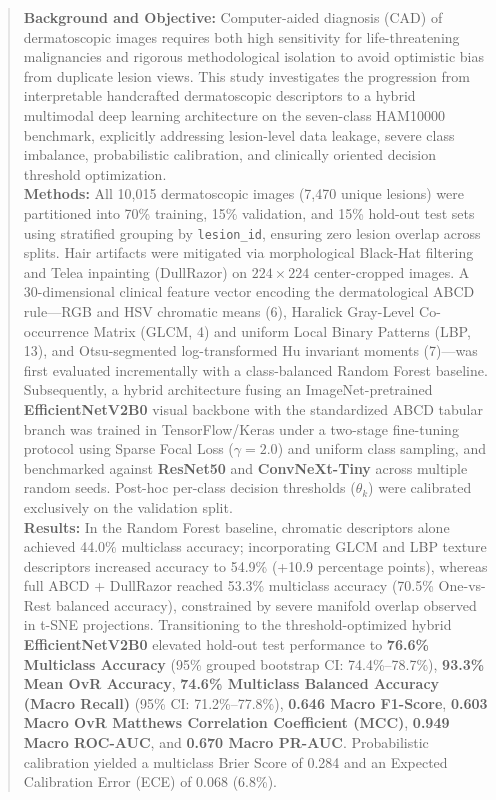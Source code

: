 \documentclass[11pt,a4paper]{article}
\begin{document}
\begin{abstract}
\noindent\textbf{Background and Objective:} Computer-aided diagnosis (CAD) of dermatoscopic images requires both high sensitivity for life-threatening malignancies and rigorous methodological isolation to avoid optimistic bias from duplicate lesion views. This study investigates the progression from interpretable handcrafted dermatoscopic descriptors to a hybrid multimodal deep learning architecture on the seven-class HAM10000 benchmark, explicitly addressing lesion-level data leakage, severe class imbalance, probabilistic calibration, and clinically oriented decision threshold optimization.\\
\noindent\textbf{Methods:} All 10,015 dermatoscopic images (7,470 unique lesions) were partitioned into 70\% training, 15\% validation, and 15\% hold-out test sets using stratified grouping by \texttt{lesion\_id}, ensuring zero lesion overlap across splits. Hair artifacts were mitigated via morphological Black-Hat filtering and Telea inpainting (DullRazor) on $224 \times 224$ center-cropped images. A 30-dimensional clinical feature vector encoding the dermatological ABCD rule---RGB and HSV chromatic means (6), Haralick Gray-Level Co-occurrence Matrix (GLCM, 4) and uniform Local Binary Patterns (LBP, 13), and Otsu-segmented log-transformed Hu invariant moments (7)---was first evaluated incrementally with a class-balanced Random Forest baseline. Subsequently, a hybrid architecture fusing an ImageNet-pretrained \textbf{EfficientNetV2B0} visual backbone with the standardized ABCD tabular branch was trained in TensorFlow/Keras under a two-stage fine-tuning protocol using Sparse Focal Loss ($\gamma=2.0$) and uniform class sampling, and benchmarked against \textbf{ResNet50} and \textbf{ConvNeXt-Tiny} across multiple random seeds. Post-hoc per-class decision thresholds ($\theta_k$) were calibrated exclusively on the validation split.\\
\noindent\textbf{Results:} In the Random Forest baseline, chromatic descriptors alone achieved 44.0\% multiclass accuracy; incorporating GLCM and LBP texture descriptors increased accuracy to 54.9\% (+10.9 percentage points), whereas full ABCD + DullRazor reached 53.3\% multiclass accuracy (70.5\% One-vs-Rest balanced accuracy), constrained by severe manifold overlap observed in t-SNE projections. Transitioning to the threshold-optimized hybrid \textbf{EfficientNetV2B0} elevated hold-out test performance to \textbf{76.6\% Multiclass Accuracy} (95\% grouped bootstrap CI: 74.4\%--78.7\%), \textbf{93.3\% Mean OvR Accuracy}, \textbf{74.6\% Multiclass Balanced Accuracy (Macro Recall)} (95\% CI: 71.2\%--77.8\%), \textbf{0.646 Macro F1-Score}, \textbf{0.603 Macro OvR Matthews Correlation Coefficient (MCC)}, \textbf{0.949 Macro ROC-AUC}, and \textbf{0.670 Macro PR-AUC}. Probabilistic calibration yielded a multiclass Brier Score of 0.284 and an Expected Calibration Error (ECE) of 0.068 (6.8\%).\\

\end{abstract}
\end{document}
